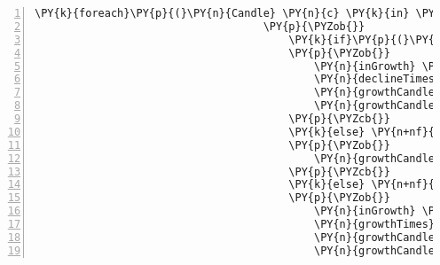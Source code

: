 \begin{Verbatim}[commandchars=\\\{\},numbers=left,firstnumber=1,stepnumber=1,numberblanklines=0]
                                    \PY{k}{foreach}\PY{p}{(}\PY{n}{Candle} \PY{n}{c} \PY{k}{in} \PY{n}{candles}\PY{p}{)}
                                    \PY{p}{\PYZob{}}
                                        \PY{k}{if}\PY{p}{(}\PY{n}{c}\PY{p}{.}\PY{n}{Close} \PY{p}{\PYZgt{}} \PY{n}{c}\PY{p}{.}\PY{n}{Open} \PY{p}{\PYZam{}}\PY{p}{\PYZam{}} \PY{n}{inGrowth} \PY{p}{=}\PY{p}{=} \PY{k}{false}\PY{p}{)}
                                        \PY{p}{\PYZob{}}
                                            \PY{n}{inGrowth} \PY{p}{=} \PY{k}{true}\PY{p}{;}
                                            \PY{n}{declineTimes}\PY{p}{.}\PY{n}{Add}\PY{p}{(}\PY{n}{growthCandles}\PY{p}{.}\PY{n}{Last}\PY{p}{(}\PY{p}{)}\PY{p}{.}\PY{n}{Time}\PY{p}{.}\PY{n}{Subtract}\PY{p}{(}\PY{n}{growthCandles}\PY{p}{.}\PY{n}{First}\PY{p}{(}\PY{p}{)}\PY{p}{.}\PY{n}{Time}\PY{p}{)}\PY{p}{)}\PY{p}{;}
                                            \PY{n}{growthCandles}\PY{p}{.}\PY{n}{Clear}\PY{p}{(}\PY{p}{)}\PY{p}{;}
                                            \PY{n}{growthCandles}\PY{p}{.}\PY{n}{Add}\PY{p}{(}\PY{n}{c}\PY{p}{)}\PY{p}{;}
                                        \PY{p}{\PYZcb{}}
                                        \PY{k}{else} \PY{n+nf}{if}\PY{p}{(}\PY{n}{c}\PY{p}{.}\PY{n}{Close} \PY{p}{\PYZgt{}} \PY{n}{c}\PY{p}{.}\PY{n}{Open} \PY{p}{\PYZam{}}\PY{p}{\PYZam{}} \PY{n}{inGrowth} \PY{p}{=}\PY{p}{=} \PY{k}{true}\PY{p}{)}
                                        \PY{p}{\PYZob{}}
                                            \PY{n}{growthCandles}\PY{p}{.}\PY{n}{Add}\PY{p}{(}\PY{n}{c}\PY{p}{)}\PY{p}{;}
                                        \PY{p}{\PYZcb{}}
                                        \PY{k}{else} \PY{n+nf}{if}\PY{p}{(}\PY{n}{c}\PY{p}{.}\PY{n}{Close} \PY{p}{\PYZlt{}} \PY{n}{c}\PY{p}{.}\PY{n}{Open} \PY{p}{\PYZam{}}\PY{p}{\PYZam{}} \PY{n}{inGrowth} \PY{p}{=}\PY{p}{=} \PY{k}{true}\PY{p}{)}
                                        \PY{p}{\PYZob{}}
                                            \PY{n}{inGrowth} \PY{p}{=} \PY{k}{false}\PY{p}{;}
                                            \PY{n}{growthTimes}\PY{p}{.}\PY{n}{Add}\PY{p}{(}\PY{n}{growthCandles}\PY{p}{.}\PY{n}{Last}\PY{p}{(}\PY{p}{)}\PY{p}{.}\PY{n}{Time}\PY{p}{.}\PY{n}{Subtract}\PY{p}{(}\PY{n}{growthCandles}\PY{p}{.}\PY{n}{First}\PY{p}{(}\PY{p}{)}\PY{p}{.}\PY{n}{Time}\PY{p}{)}\PY{p}{)}\PY{p}{;}
                                            \PY{n}{growthCandles}\PY{p}{.}\PY{n}{Clear}\PY{p}{(}\PY{p}{)}\PY{p}{;}
                                            \PY{n}{growthCandles}\PY{p}{.}\PY{n}{Add}\PY{p}{(}\PY{n}{c}\PY{p}{)}\PY{p}{;}

\end{Verbatim}
